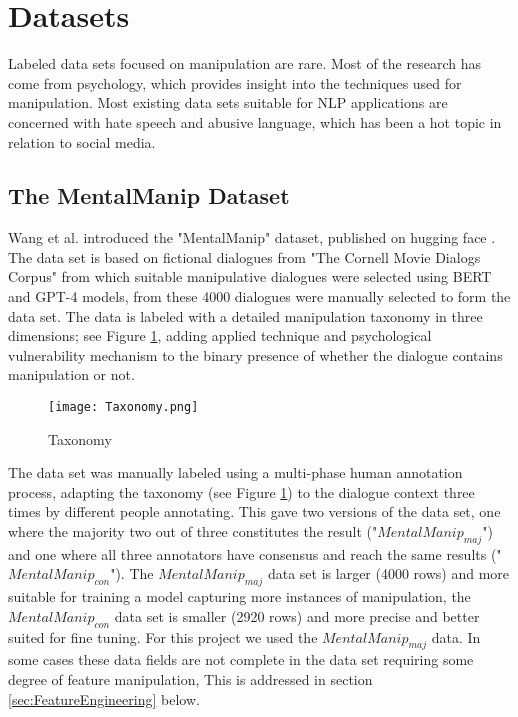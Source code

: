 \documentclass[
	letterpaper, %
	12pt, %
	unnumberedsections, %
	twoside, %
]{LTJournalArticle}
\begin{document}
\section{Datasets}
Labeled data sets focused on manipulation are rare. Most of the research has come from psychology, which provides insight into the techniques used for manipulation. Most existing data sets suitable for NLP applications are concerned with hate speech and abusive language, which has been a hot topic in relation to social media.

\subsection{The MentalManip Dataset}
Wang et al. \cite{MentalManip} introduced the "MentalManip" dataset, published on hugging face \cite{MentalManipDataset}. The data set is based on fictional dialogues from "The Cornell Movie Dialogs Corpus" \cite{CornellMovieCorpus} from which suitable manipulative dialogues were selected using BERT and GPT-4 models, from these 4000 dialogues were manually selected to form the data set. The data is labeled with a detailed manipulation taxonomy in three dimensions; see Figure \ref{fig:Taxonomy}, adding applied technique and psychological vulnerability mechanism to the binary presence of whether the dialogue contains manipulation or not.
\begin{figure}[!htp] %
	\centering
     	\texttt{[image: Taxonomy.png]}
	\caption{Taxonomy}
	\label{fig:Taxonomy}
\end{figure}

The data set was manually labeled using a multi-phase human annotation process, adapting the taxonomy (see Figure \ref{fig:Taxonomy}) to the dialogue context three times by different people annotating. This gave two versions of the data set, one where the majority two out of three constitutes the result ("$MentalManip_{maj}$") and one where all three annotators have consensus and reach the same results ("$MentalManip_{con}$"). The $MentalManip_{maj}$ data set is larger (4000 rows) and more suitable for training a model capturing more instances of manipulation, the $MentalManip_{con}$ data set is smaller (2920 rows) and more precise and better suited for fine tuning. For this project we used the $MentalManip_{maj}$ data. In some cases these data fields are not complete in the data set requiring some degree of feature manipulation, This is addressed in section \ref{sec:FeatureEngineering} below.
\end{document}
